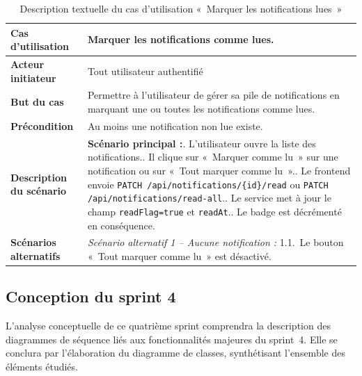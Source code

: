 \begin{table}[H]
  \caption{Description textuelle du cas d'utilisation «~Marquer les notifications lues~»}
  \label{tab:cu-marquer-lu}
  \centering
  \begin{tabularx}{\textwidth}{|L{3.8cm}|X|}
    \hline
    \textbf{Cas d'utilisation} & Marquer les notifications comme lues. \\
    \hline
    \textbf{Acteur initiateur} & Tout utilisateur authentifié \\
    \hline
    \textbf{But du cas} & Permettre à l'utilisateur de gérer sa pile de notifications en marquant une ou toutes les notifications comme lues. \\
    \hline
    \textbf{Précondition} & Au moins une notification non lue existe. \\
    \hline
    \textbf{Description du scénario} &
    \textbf{Scénario principal :}. L'utilisateur ouvre la liste des notifications.. Il clique sur «~Marquer comme lu~» sur une notification ou sur «~Tout marquer comme lu~».. Le frontend envoie \texttt{PATCH /api/notifications/\{id\}/read} ou \texttt{PATCH /api/notifications/read-all}.. Le service met à jour le champ \texttt{readFlag=true} et \texttt{readAt}.. Le badge est décrémenté en conséquence.\\
    \hline
    \textbf{Scénarios alternatifs} &
    \textit{Scénario alternatif 1 -- Aucune notification :}\newline
    \hspace*{6pt}1.1.~Le bouton «~Tout marquer comme lu~» est désactivé.\\
    \hline
  \end{tabularx}
\end{table}

\subsection{Conception du sprint 4}

L'analyse conceptuelle de ce quatrième sprint comprendra la description des
diagrammes de séquence liés aux fonctionnalités majeures du sprint~4. Elle
se conclura par l'élaboration du diagramme de classes, synthétisant
l'ensemble des éléments étudiés.

